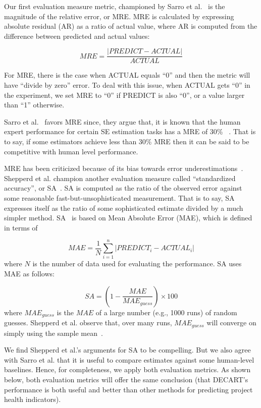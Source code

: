 \documentclass[sigconf,review,anonymous]{acmart}
\begin{document}
Our first evaluation measure metric, championed by  Sarro et al.~\cite{sarro2016multi} is the magnitude of the relative error, or MRE. MRE is calculated by expressing absolute residual (AR) as a ratio of actual value, where AR is computed from the difference between predicted and actual values:

\[
\mathit{MRE} = \frac{|\mathit{PREDICT} - \mathit{ACTUAL}|}{\mathit{ACTUAL}}
\]

For MRE, there is the case when ACTUAL equals ``0'' and then the metric will have ``divide by zero'' error. To deal with this issue, when ACTUAL gets ``0'' in the experiment, we set MRE to ``0'' if PREDICT is also ``0'', or a value larger than ``1'' otherwise.

Sarro et al.~\cite{sarro2016multi} favors MRE
since, they argue that, it is known that the human expert performance
for certain SE estimation tasks  has a MRE of 30\% ~\cite{molokken2003review}. That is to say, if some estimators achieve less than 30\% MRE then it can be said to be competitive with human level performance.  




MRE has been criticized because of its bias towards error underestimations~\cite{foss2003simulation,kitchenham2001accuracy,korte2008confidence,port2008comparative,shepperd2000building,stensrud2003further}.  
Shepperd et al. champion another evaluation measure called ``standardized accuracy'', or SA~\cite{shepperd2012evaluating}.
SA is computed as the ratio of the observed error against some reasonable fast-but-unsophisticated measurement. That is to say, 
SA expresses itself as the ratio of some sophisticated estimate
divided by a much simpler method.
SA~\cite{langdon2016exact,shepperd2012evaluating} is based on Mean Absolute Error (MAE), which is defined in terms of 

\[
\mathit{MAE}=\frac{1}{N}\sum_{i=1}^n|\mathit{PREDICT}_i-\mathit{ACTUAL}_i|
\]
where $N$ is the number of data used for evaluating the performance. SA uses MAE as follows:

\[
\mathit{SA} = (1-\frac{\mathit{MAE}}{\mathit{MAE}_{guess}})\times 100
\]
where $\mathit{MAE}_{guess}$ is the $\mathit{MAE}$ of a large number (e.g., 1000 runs) of random guesses. 
  Shepperd et al. observe that, over many runs,  $\mathit{MAE}_{guess}$ will converge on simply using the sample mean~\cite{shepperd2012evaluating}. 

We find Shepperd et al.'s arguments for SA to be compelling. But we also agree with Sarro et al. that it is useful to   compare estimates against some human-level baselines. Hence, for completeness, we apply both evaluation metrics. As shown below, both evaluation metrics will offer the same conclusion (that DECART's performance is both useful and better than other  methods for predicting project health indicators).
\end{document}
